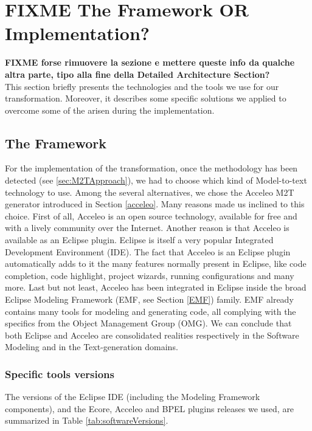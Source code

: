 \section{FIXME The Framework OR Implementation? }
\label{sec:TheFramework}
\textbf{FIXME forse rimuovere la sezione e mettere queste info da qualche altra parte, tipo alla fine della Detailed Architecture Section?} \\
This section briefly presents the technologies and the tools we use for our transformation. Moreover, it describes some specific solutions we applied to overcome some of the arisen during the implementation.

\subsection{The Framework}
\label{framework}
For the implementation of the transformation, once the methodology has been detected (see \ref{sec:M2TApproach}), we had to choose which kind of Model-to-text technology to use. Among the several alternatives, we chose the Acceleo M2T generator introduced in Section \ref{acceleo}.
Many reasons made us inclined to this choice. 
First of all, Acceleo is an open source technology, available for free and with a lively community over the Internet. Another reason is that Acceleo is available as an Eclipse plugin. Eclipse is itself a very popular Integrated Development Environment (IDE). The fact that Acceleo is an Eclipse plugin automatically adds to it the many features normally present in Eclipse, like code completion, code highlight, project wizards, running configurations and many more. 
Last but not least, Acceleo has been integrated in Eclipse inside the broad Eclipse Modeling Framework (EMF, see Section \ref{EMF}) family. EMF already contains many tools for modeling and generating code, all complying with the specifics from the Object Management Group (OMG).
We can conclude that both Eclipse and Acceleo are consolidated realities respectively in the Software Modeling and in the Text-generation domains. 
\subsubsection{Specific tools versions}
\label{sec:specificTools}
The versions of the Eclipse IDE (including the Modeling Framework components), and the Ecore, Acceleo and BPEL plugins releases we used, are summarized in Table \ref{tab:softwareVersions}.

